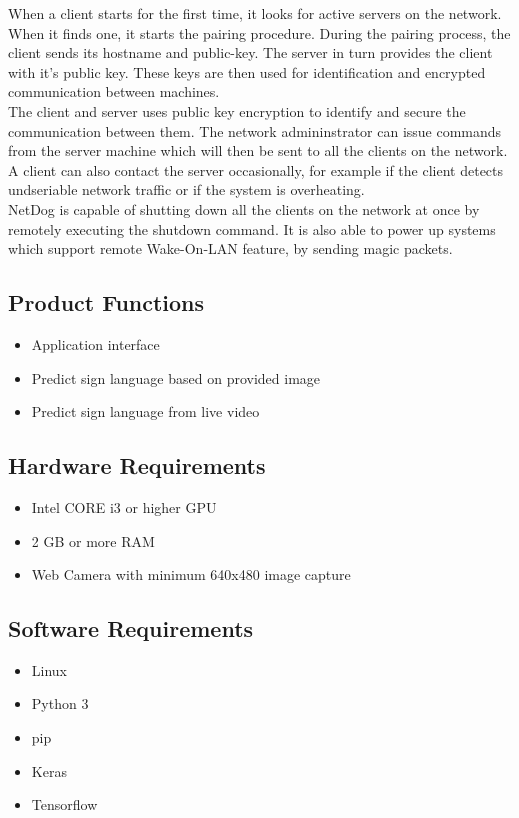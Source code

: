 When a client starts for the first time, it looks for active servers on the
network. When it finds one, it starts the pairing procedure. During the pairing
process, the client sends its hostname and public-key. The server in turn
provides the client with it's public key. These keys are then used for
identification and encrypted communication between machines.\\

The client and server uses public key encryption to identify and secure the
communication between them. The network admininstrator can issue commands from
the server machine which will then be sent to all the clients on the network.
A client can also contact the server occasionally, for example if the client
detects undseriable network traffic or if the system is overheating.\\

NetDog is capable of shutting down all the clients on the network at once by
remotely executing the shutdown command. It is also able to power up systems
which support remote Wake-On-LAN feature, by sending magic packets.\\

\subsection{Product Functions}
\begin{itemize}
    \item Application interface
    \item Predict sign language based on provided image 
    \item Predict sign language from live video 

\end{itemize}

\subsection{Hardware Requirements}
\begin{itemize}
    \item Intel CORE i3 or higher GPU
    \item 2 GB or more RAM
    \item Web Camera with minimum 640x480 image capture
\end{itemize}

\subsection{Software Requirements}
\begin{itemize}
    \item Linux
    \item Python 3
    \item pip
    \item Keras
    \item Tensorflow
\end{itemize}

